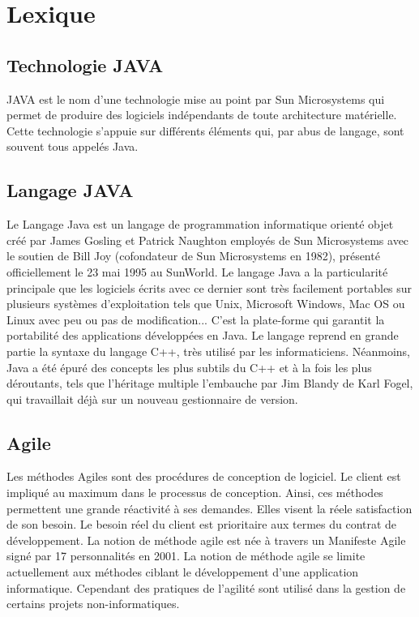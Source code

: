 \chapter{Lexique}
\section{Technologie JAVA}\label{lexique:JAVA_tech}
JAVA est le nom d'une technologie mise au point par Sun Microsystems qui permet de produire des logiciels indépendants de toute architecture matérielle. Cette technologie s'appuie sur différents éléments qui, par abus de langage, sont souvent tous appelés Java.
\section{Langage JAVA}\label{lexique:JAVA_lg}
Le Langage Java est un langage de programmation informatique orienté objet créé par James Gosling et Patrick Naughton employés de Sun Microsystems avec le soutien de Bill Joy (cofondateur de Sun Microsystems en 1982), présenté officiellement le 23 mai 1995 au SunWorld. Le langage Java a la particularité principale que les logiciels écrits avec ce dernier sont très facilement portables sur plusieurs systèmes d'exploitation tels que Unix, Microsoft Windows, Mac OS ou Linux avec peu ou pas de modification... C'est la plate-forme qui garantit la portabilité des applications développées en Java. Le langage reprend en grande partie la syntaxe du langage C++, très utilisé par les informaticiens. Néanmoins, Java a été épuré des concepts les plus subtils du C++ et à la fois les plus déroutants, tels que l'héritage multiple l'embauche par Jim Blandy de Karl Fogel, qui travaillait déjà sur un nouveau gestionnaire de version. 
\section{Agile}\label{lexique:agile}
Les méthodes Agiles sont des procédures de conception de logiciel. Le client est impliqué au maximum dans le processus de conception. Ainsi, ces méthodes permettent une grande réactivité à ses demandes. Elles visent la réele satisfaction de son besoin. Le besoin réel du client est prioritaire aux termes du contrat de développement. La notion de méthode agile est née à travers un Manifeste Agile signé par 17 personnalités en 2001. La notion de méthode agile se limite actuellement aux méthodes ciblant le développement d'une application informatique. Cependant des pratiques de l'agilité sont utilisé dans la gestion de certains projets non-informatiques.
